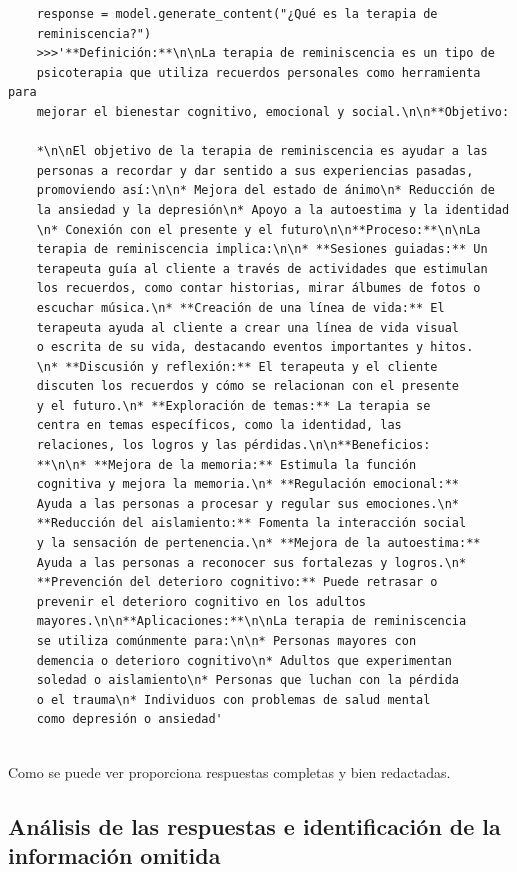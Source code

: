 \begin{verbatim}
	response = model.generate_content("¿Qué es la terapia de 
	reminiscencia?")
	>>>'**Definición:**\n\nLa terapia de reminiscencia es un tipo de
	psicoterapia que utiliza recuerdos personales como herramienta para
	mejorar el bienestar cognitivo, emocional y social.\n\n**Objetivo:
	
	*\n\nEl objetivo de la terapia de reminiscencia es ayudar a las
	personas a recordar y dar sentido a sus experiencias pasadas, 
	promoviendo así:\n\n* Mejora del estado de ánimo\n* Reducción de 
	la ansiedad y la depresión\n* Apoyo a la autoestima y la identidad
	\n* Conexión con el presente y el futuro\n\n**Proceso:**\n\nLa 
	terapia de reminiscencia implica:\n\n* **Sesiones guiadas:** Un
	terapeuta guía al cliente a través de actividades que estimulan
	los recuerdos, como contar historias, mirar álbumes de fotos o
	escuchar música.\n* **Creación de una línea de vida:** El
	terapeuta ayuda al cliente a crear una línea de vida visual
	o escrita de su vida, destacando eventos importantes y hitos.
	\n* **Discusión y reflexión:** El terapeuta y el cliente
	discuten los recuerdos y cómo se relacionan con el presente
	y el futuro.\n* **Exploración de temas:** La terapia se 
	centra en temas específicos, como la identidad, las 
	relaciones, los logros y las pérdidas.\n\n**Beneficios:
	**\n\n* **Mejora de la memoria:** Estimula la función 
	cognitiva y mejora la memoria.\n* **Regulación emocional:**
	Ayuda a las personas a procesar y regular sus emociones.\n*
	**Reducción del aislamiento:** Fomenta la interacción social
	y la sensación de pertenencia.\n* **Mejora de la autoestima:**
	Ayuda a las personas a reconocer sus fortalezas y logros.\n*
	**Prevención del deterioro cognitivo:** Puede retrasar o
	prevenir el deterioro cognitivo en los adultos
	mayores.\n\n**Aplicaciones:**\n\nLa terapia de reminiscencia
	se utiliza comúnmente para:\n\n* Personas mayores con
	demencia o deterioro cognitivo\n* Adultos que experimentan
	soledad o aislamiento\n* Personas que luchan con la pérdida
	o el trauma\n* Individuos con problemas de salud mental
	como depresión o ansiedad'
	
\end{verbatim}

Como se puede ver proporciona respuestas completas y bien redactadas.

\subsection{Análisis de las respuestas e identificación de la información omitida}

